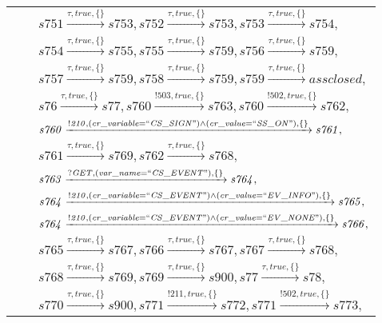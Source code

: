 \begin{tabular}{lcp{350px}}
& & $\mathit{s751}\xrightarrow{\mathit{\tau}, \mathit{true}, \{\}}\mathit{s753},\mathit{s752}\xrightarrow{\mathit{\tau}, \mathit{true}, \{\}}\mathit{s753},\mathit{s753}\xrightarrow{\mathit{\tau}, \mathit{true}, \{\}}\mathit{s754},$ \\
& & $\mathit{s754}\xrightarrow{\mathit{\tau}, \mathit{true}, \{\}}\mathit{s755},\mathit{s755}\xrightarrow{\mathit{\tau}, \mathit{true}, \{\}}\mathit{s759},\mathit{s756}\xrightarrow{\mathit{\tau}, \mathit{true}, \{\}}\mathit{s759},$ \\
& & $\mathit{s757}\xrightarrow{\mathit{\tau}, \mathit{true}, \{\}}\mathit{s759},\mathit{s758}\xrightarrow{\mathit{\tau}, \mathit{true}, \{\}}\mathit{s759},\mathit{s759}\xrightarrow{\mathit{\tau}, \mathit{true}, \{\}}\mathit{assclosed},$ \\
& & $\mathit{s76}\xrightarrow{\mathit{\tau}, \mathit{true}, \{\}}\mathit{s77},\mathit{s760}\xrightarrow{\mathit{!503}, \mathit{true}, \{\}}\mathit{s763},\mathit{s760}\xrightarrow{\mathit{!502}, \mathit{true}, \{\}}\mathit{s762},$ \\
& & $\mathit{s760}\xrightarrow{\mathit{!210}, \mathit{(cr\_variable = ``CS\_SIGN") \land (cr\_value = ``SS\_ON")}, \{\}}\mathit{s761},$ \\
& & $\mathit{s761}\xrightarrow{\mathit{\tau}, \mathit{true}, \{\}}\mathit{s769},\mathit{s762}\xrightarrow{\mathit{\tau}, \mathit{true}, \{\}}\mathit{s768},$ \\
& & $\mathit{s763}\xrightarrow{\mathit{?GET}, \mathit{(var\_name = ``CS\_EVENT")}, \{\}}\mathit{s764},$ \\
& & $\mathit{s764}\xrightarrow{\mathit{!210}, \mathit{(cr\_variable = ``CS\_EVENT") \land (cr\_value = ``EV\_INFO")}, \{\}}\mathit{s765},$ \\
& & $\mathit{s764}\xrightarrow{\mathit{!210}, \mathit{(cr\_variable = ``CS\_EVENT") \land (cr\_value = ``EV\_NONE")}, \{\}}\mathit{s766},$ \\
& & $\mathit{s765}\xrightarrow{\mathit{\tau}, \mathit{true}, \{\}}\mathit{s767},\mathit{s766}\xrightarrow{\mathit{\tau}, \mathit{true}, \{\}}\mathit{s767},\mathit{s767}\xrightarrow{\mathit{\tau}, \mathit{true}, \{\}}\mathit{s768},$ \\
& & $\mathit{s768}\xrightarrow{\mathit{\tau}, \mathit{true}, \{\}}\mathit{s769},\mathit{s769}\xrightarrow{\mathit{\tau}, \mathit{true}, \{\}}\mathit{s900},\mathit{s77}\xrightarrow{\mathit{\tau}, \mathit{true}, \{\}}\mathit{s78},$ \\
& & $\mathit{s770}\xrightarrow{\mathit{\tau}, \mathit{true}, \{\}}\mathit{s900},\mathit{s771}\xrightarrow{\mathit{!211}, \mathit{true}, \{\}}\mathit{s772},\mathit{s771}\xrightarrow{\mathit{!502}, \mathit{true}, \{\}}\mathit{s773},$ \\

\end{tabular}
